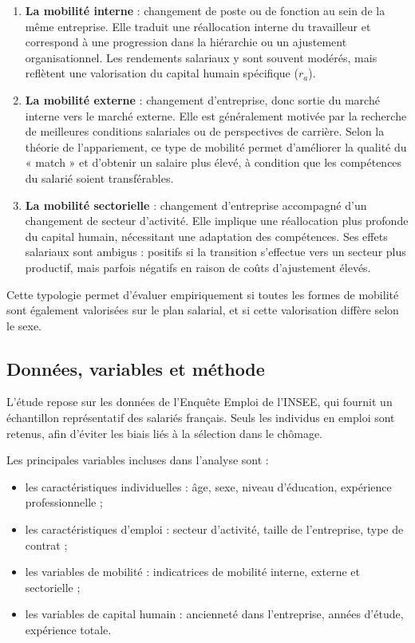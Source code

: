 \documentclass[12pt,a4paper]{article}
\begin{document}
\begin{enumerate}
    \item \textbf{La mobilité interne} : changement de poste ou de fonction au sein de la même entreprise.  
    Elle traduit une réallocation interne du travailleur et correspond à une progression dans la hiérarchie ou un ajustement organisationnel.  
    Les rendements salariaux y sont souvent modérés, mais reflètent une valorisation du capital humain spécifique ($r_a$).

    \item \textbf{La mobilité externe} : changement d’entreprise, donc sortie du marché interne vers le marché externe.  
    Elle est généralement motivée par la recherche de meilleures conditions salariales ou de perspectives de carrière.  
    Selon la théorie de l’appariement, ce type de mobilité permet d’améliorer la qualité du « match » et d’obtenir un salaire plus élevé, à condition que les compétences du salarié soient transférables.

    \item \textbf{La mobilité sectorielle} : changement d’entreprise accompagné d’un changement de secteur d’activité.  
    Elle implique une réallocation plus profonde du capital humain, nécessitant une adaptation des compétences.  
    Ses effets salariaux sont ambigus : positifs si la transition s’effectue vers un secteur plus productif, mais parfois négatifs en raison de coûts d’ajustement élevés.
\end{enumerate}

Cette typologie permet d’évaluer empiriquement si toutes les formes de mobilité sont également valorisées sur le plan salarial, et si cette valorisation diffère selon le sexe.

\subsection{Données, variables et méthode}

L’étude repose sur les données de l’Enquête Emploi de l’INSEE, qui fournit un échantillon représentatif des salariés français.  
Seuls les individus en emploi sont retenus, afin d’éviter les biais liés à la sélection dans le chômage.

Les principales variables incluses dans l’analyse sont :
\begin{itemize}
    \item les caractéristiques individuelles : âge, sexe, niveau d’éducation, expérience professionnelle ;
    \item les caractéristiques d’emploi : secteur d’activité, taille de l’entreprise, type de contrat ;
    \item les variables de mobilité : indicatrices de mobilité interne, externe et sectorielle ;
    \item les variables de capital humain : ancienneté dans l’entreprise, années d’étude, expérience totale.
\end{itemize}
\end{document}
